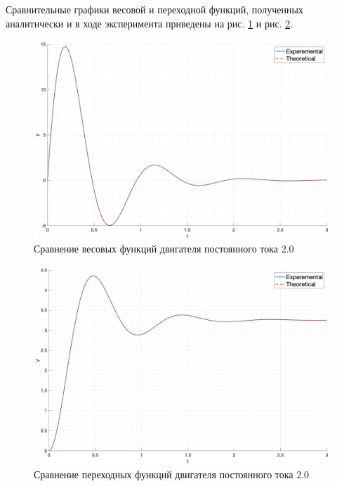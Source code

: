 Сравнительные графики весовой и переходной функций, полученных аналитически и в ходе эксперимента  приведены на рис. \ref{fig:task2_impulse_response_cmp} и рис. \ref{fig:task2_step_response_cmp}.
\begin{figure}[ht!]
    \centering
    \includegraphics[width=\textwidth]{media/plots/task2_impulse_response_cmp.png}
    \caption{Сравнение весовых функций двигателя постоянного тока 2.0}
    \label{fig:task2_impulse_response_cmp}
\end{figure}
\begin{figure}[ht!]
    \centering
    \includegraphics[width=\textwidth]{media/plots/task2_step_response_cmp.png}
    \caption{Сравнение переходных функций двигателя постоянного тока 2.0}
    \label{fig:task2_step_response_cmp}
\end{figure}

\FloatBarrier
